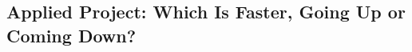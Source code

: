 \documentclass{sebase}
\begin{document}
\chapter[7\quad Differential Equations]{}

\section{Applied Project: Which Is Faster, Going Up or Coming Down?}

\renewcommand{\CCC}{1}%
\end{document}
